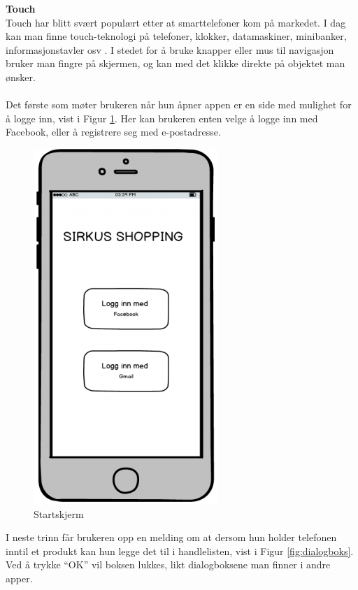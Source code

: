 \noindent\textbf{Touch}\\
Touch har blitt svært populært etter at smarttelefoner kom på markedet. I dag kan man finne touch-teknologi på telefoner, klokker, datamaskiner, minibanker,  informasjonstavler osv \cite[p.~197]{preece}. I stedet for å bruke knapper eller mus til navigasjon bruker man fingre på skjermen, og kan med det klikke direkte på objektet man ønsker.
\\\\
Det første som møter brukeren når hun åpner appen er en side med mulighet for å logge inn, vist i Figur \ref{fig:startskjerm}. Her kan brukeren enten velge å logge inn med Facebook, eller å registrere seg med e-postadresse.

\begin{figure}[H]
\includegraphics[scale=0.5]{images/prototype1/startskjerm}
\centering %
\caption{Startskjerm}
\label{fig:startskjerm}
\end{figure}

\noindent I neste trinn får brukeren opp en melding om at dersom hun holder telefonen inntil et produkt kan hun legge det til i handlelisten, vist i Figur \ref{fig:dialogboks}. Ved å trykke “OK” vil boksen lukkes, likt dialogboksene man finner i andre apper.

